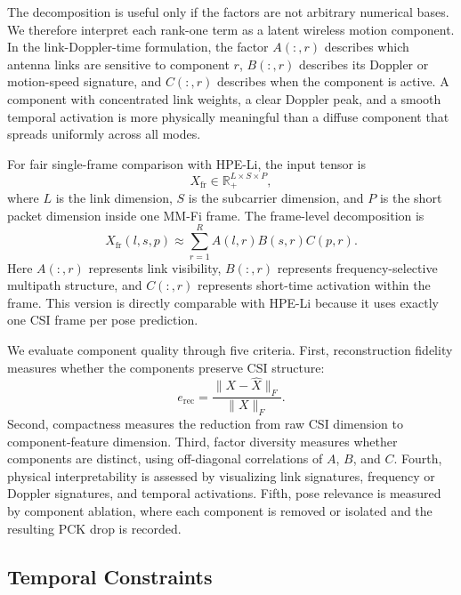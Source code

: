 \documentclass[10pt,journal]{IEEEtran}
\begin{document}
The decomposition is useful only if the factors are not arbitrary numerical bases. We therefore interpret each rank-one term as a latent wireless motion component. In the link-Doppler-time formulation, the factor $A(:,r)$ describes which antenna links are sensitive to component $r$, $B(:,r)$ describes its Doppler or motion-speed signature, and $C(:,r)$ describes when the component is active. A component with concentrated link weights, a clear Doppler peak, and a smooth temporal activation is more physically meaningful than a diffuse component that spreads uniformly across all modes.

For fair single-frame comparison with HPE-Li, the input tensor is
\begin{equation}
    X_{\mathrm{fr}} \in \mathbb{R}_{+}^{L\times S\times P},
\end{equation}
where $L$ is the link dimension, $S$ is the subcarrier dimension, and $P$ is the short packet dimension inside one MM-Fi frame. The frame-level decomposition is
\begin{equation}
    X_{\mathrm{fr}}(l,s,p)
    \approx
    \sum_{r=1}^{R}
    A(l,r)B(s,r)C(p,r).
    \label{eq:frame_cp}
\end{equation}
Here $A(:,r)$ represents link visibility, $B(:,r)$ represents frequency-selective multipath structure, and $C(:,r)$ represents short-time activation within the frame. This version is directly comparable with HPE-Li because it uses exactly one CSI frame per pose prediction.

We evaluate component quality through five criteria. First, reconstruction fidelity measures whether the components preserve CSI structure:
\begin{equation}
    e_{\mathrm{rec}}
    =
    \frac{\|X-\hat{X}\|_F}{\|X\|_F}.
\end{equation}
Second, compactness measures the reduction from raw CSI dimension to component-feature dimension. Third, factor diversity measures whether components are distinct, using off-diagonal correlations of $A$, $B$, and $C$. Fourth, physical interpretability is assessed by visualizing link signatures, frequency or Doppler signatures, and temporal activations. Fifth, pose relevance is measured by component ablation, where each component is removed or isolated and the resulting PCK drop is recorded.

\subsection{Temporal Constraints}
\end{document}
